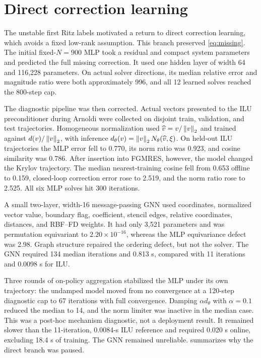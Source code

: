 \section{Direct correction learning}

The unstable first Ritz labels motivated a return to direct correction learning, which avoids a fixed low-rank assumption. This branch preserved \cref{eq:missing}. The initial fixed-$N=900$ MLP took a residual and compact system parameters and predicted the full missing correction. It used one hidden layer of width 64 and 116,228 parameters. On actual solver directions, its median relative error and magnitude ratio were both approximately 996, and all 12 learned solves reached the 800-step cap.

The diagnostic pipeline was then corrected.  Actual vectors presented to the ILU preconditioner during Arnoldi were collected on disjoint train, validation, and test trajectories.  Homogeneous normalization used $\widehat v=v/\left\lVert v\right\rVert_2$ and trained against $d(v)/\left\lVert v\right\rVert_2$, with inference $d_\theta(v)=\left\lVert v\right\rVert_2N_\theta(\widehat v,\xi)$.  On held-out ILU trajectories the MLP error fell to 0.770, its norm ratio was 0.923, and cosine similarity was 0.786.  After insertion into FGMRES, however, the model changed the Krylov trajectory.  The median nearest-training cosine fell from 0.653 offline to 0.159, closed-loop correction error rose to 2.519, and the norm ratio rose to 2.525.  All six MLP solves hit 300 iterations.

A small two-layer, width-16 message-passing GNN used coordinates, normalized vector value, boundary flag, coefficient, stencil edges, relative coordinates, distances, and RBF--FD weights.  It had only 3,521 parameters and was permutation equivariant to $2.20\times10^{-16}$, whereas the MLP equivariance defect was 2.98.  Graph structure repaired the ordering defect, but not the solver.  The GNN required 134 median iterations and 0.813 s, compared with 11 iterations and 0.0098 s for ILU.

Three rounds of on-policy aggregation stabilized the MLP under its own trajectory: the undamped model moved from no convergence at a 120-step diagnostic cap to 67 iterations with full convergence.  Damping $\alpha d_\theta$ with $\alpha=0.1$ reduced the median to 14, and the norm limiter was inactive in the median case.  This was a post-hoc mechanism diagnostic, not a deployment result.  It remained slower than the 11-iteration, 0.0084-s ILU reference and required 0.020 s online, excluding 18.4 s of training.  The GNN remained unreliable.   summarizes why the direct branch was paused.


